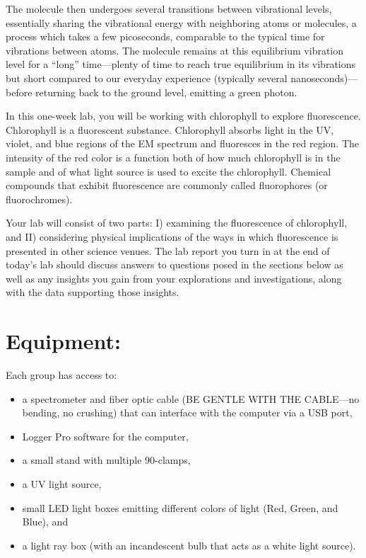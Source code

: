 The molecule then undergoes several transitions between vibrational levels, essentially sharing the vibrational energy with neighboring atoms or molecules, a process which takes a few picoseconds, comparable to the typical time for vibrations between atoms.
The molecule remains at this equilibrium vibration level for a “long” time—plenty of time to reach true equilibrium in its vibrations but short compared to our everyday experience (typically several nanoseconds)— before returning back to the ground level, emitting a green photon.
\par 
In this one-week lab, you will be working with chlorophyll to explore fluorescence. 
Chlorophyll is a fluorescent substance. 
Chlorophyll absorbs light in the UV, violet, and blue regions of the EM spectrum and fluoresces in the red region. 
The intensity of the red color is a function both of how much chlorophyll is in the sample and of what light source is used to excite the chlorophyll. 
Chemical compounds that exhibit fluorescence are commonly called fluorophores (or fluorochromes).
\par 
Your lab will consist of two parts: I) examining the fluorescence of chlorophyll, and II) considering physical implications of the ways in which fluorescence is presented in other science venues. 
The lab report you turn in at the end of today's lab should discuss answers to questions posed in the sections below as well as any insights you gain from your explorations and investigations, along with the data supporting those insights.

\section*{Equipment:}
Each group has access to:
\begin{itemize}
\item a spectrometer and fiber optic cable (BE GENTLE WITH THE CABLE—no bending, no crushing) that can interface with the computer via a USB port,
\item Logger Pro software for the computer,
\item a small stand with multiple 90-clamps,
\item a UV light source,
\item small LED light boxes emitting different colors of light (Red, Green, and Blue), and
\item a light ray box (with an incandescent bulb that acts as a white light source).
\end{itemize}

